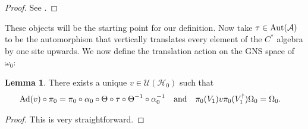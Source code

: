 \documentclass[12pt,a4paper,twoside]{article}
\let\originalleft\left
\let\originalright\right
\renewcommand{\left}{\mathopen{}\mathclose\bgroup\originalleft}
\renewcommand{\right}{\aftergroup\egroup\originalright}
\newcommand{\UU}{\mathcal U}
\newcommand{\HH}{\mathcal H}
\renewcommand{\AA}{\mathcal A}
\newcommand{\Ad}[1]{\textrm{Ad}\left(#1\right)}
\newcommand{\Aut}[1]{\textrm{Aut}\left(#1\right)}
\theoremstyle{definition}
\newtheorem{lemma}[theorem]{Lemma}
\numberwithin{equation}{section}
\begin{document}
\begin{proof}
	See \cite{ogata2021h3gmathbb}.
\end{proof}
These objects will be the starting point for our definition. Now take $\tau\in\Aut{\AA}$ to be the automorphism that vertically translates every element of the $C^*$ algebra by one site upwards. We now define the translation action on the GNS space of $\omega_0$:
\begin{lemma}
	There exists a unique $v\in\UU(\HH_0)$ such that
	\begin{align}
	\Ad{v}\circ\pi_0&=\pi_0\circ\alpha_0\circ\Theta\circ\tau\circ\Theta^{-1}\circ\alpha_0^{-1}&&\text{and}&\pi_0(V_1)v\pi_0(V_1^\dagger)\Omega_0&=\Omega_0.
	\end{align}
\end{lemma}
\begin{proof}
	This is very straightforward.
\end{proof}
\end{document}
